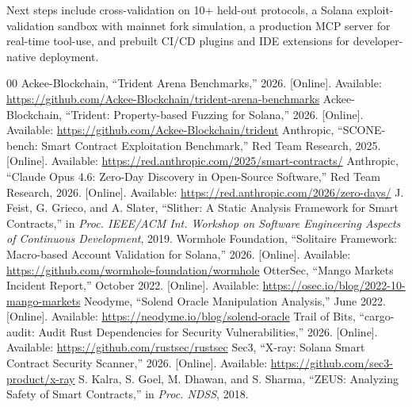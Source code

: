 \documentclass[conference]{IEEEtran}
\begin{document}
Next steps include cross-validation on 10+ held-out protocols, a Solana exploit-validation sandbox with mainnet fork simulation, a production MCP server for real-time tool-use, and prebuilt CI/CD plugins and IDE extensions for developer-native deployment.

\begin{thebibliography}{00}
 Ackee-Blockchain, ``Trident Arena Benchmarks,'' 2026. [Online]. Available: \url{https://github.com/Ackee-Blockchain/trident-arena-benchmarks}
 Ackee-Blockchain, ``Trident: Property-based Fuzzing for Solana,'' 2026. [Online]. Available: \url{https://github.com/Ackee-Blockchain/trident}
 Anthropic, ``SCONE-bench: Smart Contract Exploitation Benchmark,'' Red Team Research, 2025. [Online]. Available: \url{https://red.anthropic.com/2025/smart-contracts/}
 Anthropic, ``Claude Opus 4.6: Zero-Day Discovery in Open-Source Software,'' Red Team Research, 2026. [Online]. Available: \url{https://red.anthropic.com/2026/zero-days/}
 J. Feist, G. Grieco, and A. Slater, ``Slither: A Static Analysis Framework for Smart Contracts,'' in {\it Proc. IEEE/ACM Int. Workshop on Software Engineering Aspects of Continuous Development}, 2019.
 Wormhole Foundation, ``Solitaire Framework: Macro-based Account Validation for Solana,'' 2026. [Online]. Available: \url{https://github.com/wormhole-foundation/wormhole}
 OtterSec, ``Mango Markets Incident Report,'' October 2022. [Online]. Available: \url{https://osec.io/blog/2022-10-mango-markets}
 Neodyme, ``Solend Oracle Manipulation Analysis,'' June 2022. [Online]. Available: \url{https://neodyme.io/blog/solend-oracle}
 Trail of Bits, ``cargo-audit: Audit Rust Dependencies for Security Vulnerabilities,'' 2026. [Online]. Available: \url{https://github.com/rustsec/rustsec}
 Sec3, ``X-ray: Solana Smart Contract Security Scanner,'' 2026. [Online]. Available: \url{https://github.com/sec3-product/x-ray}
 S. Kalra, S. Goel, M. Dhawan, and S. Sharma, ``ZEUS: Analyzing Safety of Smart Contracts,'' in {\it Proc. NDSS}, 2018.
\end{thebibliography}
\end{document}
